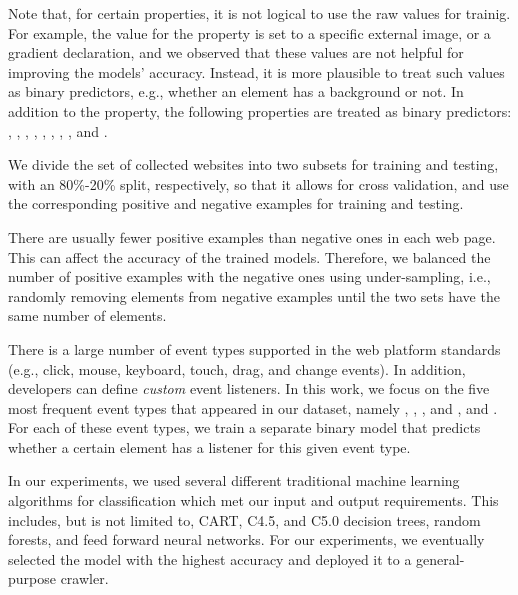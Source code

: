 Note that, for certain \css properties, 
it is not logical to use the raw values for trainig.
For example, the value for the  property
is set to a specific external image, or a gradient declaration,
and we observed that these values are not helpful for improving the models' accuracy.
Instead, it is more plausible 
to treat such values as binary predictors,
e.g., whether an element has a background or not.
In addition to the  property,
the following \css properties are treated as binary predictors:
,
,
,
,
,
,
,
, and
.




 We divide the set of collected websites
into two subsets for training and testing,
with an 80\%-20\% split, respectively, so that it allows for cross validation,
and use the corresponding positive and negative examples for training and testing.

 There are usually fewer positive examples 
than negative ones in each web page.
This can affect the accuracy of the trained models.
Therefore, we balanced the number of positive examples 
with the negative ones
using under-sampling, i.e., randomly removing elements from negative examples
until the two sets have the same number of elements.

There is a large number of event types supported in the web platform standards
(e.g., click, mouse, keyboard, touch, drag, and change events).
In addition, developers can define \textit{custom} event listeners.
In this work, we focus on the five most frequent event types
that appeared in our dataset, 
namely , , , and , and .
For each of these event types, we train a separate binary model
that predicts whether a certain element has a listener for this given event type.


In our experiments, we used several different traditional machine learning algorithms  
for classification
which met our input and output requirements.
This includes, but is not limited to, CART, C4.5, and C5.0 decision trees,
random forests,
and feed forward neural networks.
For our experiments, we eventually selected the model with the highest accuracy
and deployed it to a general-purpose crawler.



